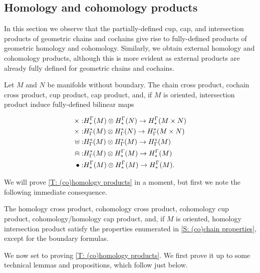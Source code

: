 \subsection{Homology and cohomology products}\label{S: homology products}

In this section we observe that the partially-defined cup, cap, and intersection products of geometric chains and cochains give rise to fully-defined products of geometric homology and cohomology. Similarly, we obtain external homology and cohomology products, although this is more evident as external products are already fully defined for geometric chains and cochains.

\begin{theorem}\label{T: (co)homology products}
Let $M$ and $N$ be  manifolds without boundary. The chain cross product, cochain cross product, cup product, cap product, and, if $M$ is oriented, intersection product induce fully-defined bilinear maps

\begin{align*}
\times:& H^\Gamma_*(M)\otimes H^\Gamma_*(N)\to H^\Gamma_*(M\times N)\\
\times:& H_\Gamma^*(M)\otimes H_\Gamma^*(N)\to H_\Gamma^*(M\times N)\\
\uplus:& H_\Gamma^*(M)\otimes H_\Gamma^*(M)\to H_\Gamma^*(M)\\
\nplus:& H_\Gamma^*(M)\otimes H^\Gamma_*(M)\to H^\Gamma_*(M)\\
\bullet:& H^\Gamma_*(M)\otimes H^\Gamma_*(M)\to H^\Gamma_*(M).\\
\end{align*}
\end{theorem}

We will prove \cref{T: (co)homology products} in a moment, but first we note the following immediate consequence.
\begin{theorem}
The homology cross product, cohomology  cross product, cohomology cup product, cohomology/homology cap product, and, if $M$ is oriented, homology intersection product satisfy the properties enumerated in \cref{S: (co)chain properties},  except for the boundary formulas.
\end{theorem}



We now set to proving \cref{T: (co)homology products}. We first prove it up to some technical lemmas and propositions, which follow just below.


